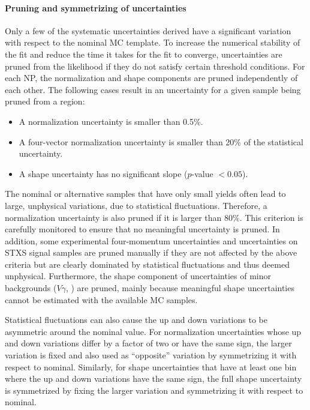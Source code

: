 \paragraph{Pruning and symmetrizing of uncertainties}
Only a few of the systematic uncertainties derived have a significant variation with respect to the nominal MC template. To increase the numerical stability of the fit and reduce the time it takes for the fit to converge, uncertainties are pruned from the likelihood if they do not satisfy certain threshold conditions.
For each NP, the normalization and shape components are pruned independently of each other.
The following cases result in an uncertainty for a given sample being pruned from a region:
\begin{itemize}
    \item A normalization uncertainty is smaller than 0.5\%.
    \item A four-vector normalization uncertainty is smaller than 20\% of the statistical uncertainty. 
    \item A shape uncertainty has no significant slope ($p$-value $< 0.05$).
\end{itemize}
The nominal or alternative samples that have only small yields often lead to large, unphysical variations, due to statistical fluctuations. 
Therefore, a normalization uncertainty is also pruned if it is larger than 80\%. 
This criterion is carefully monitored to ensure that no meaningful uncertainty is pruned.
In addition, some experimental four-momentum uncertainties and uncertainties on STXS signal samples are pruned manually if they are not affected by the above criteria but are clearly dominated by statistical fluctuations and thus deemed unphysical.
Furthermore, the shape component of uncertainties of minor backgrounds ($V\gamma$, \Zgamma) are pruned, mainly because meaningful shape uncertainties cannot be estimated with the available MC samples. 

Statistical fluctuations can also cause the up and down variations to be asymmetric around the nominal value. 
For normalization uncertainties whose up and down variations differ by a factor of two or have the same sign, the larger variation is fixed and also used as ``opposite'' variation by symmetrizing it with respect to nominal.
Similarly, for shape uncertainties that have at least one bin where the up and down variations have the same sign, the full shape uncertainty is symmetrized by fixing the larger variation and symmetrizing it with respect to nominal.

